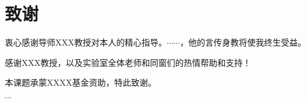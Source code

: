 
\chapter*{致\quad 谢}

衷心感谢导师XXX教授对本人的精心指导。$\cdots\cdots$，他的言传身教将使我终生受益。

感谢XXX教授，以及实验室全体老师和同窗们的热情帮助和支持！

本课题承蒙XXXX基金资助，特此致谢。

$\cdots$